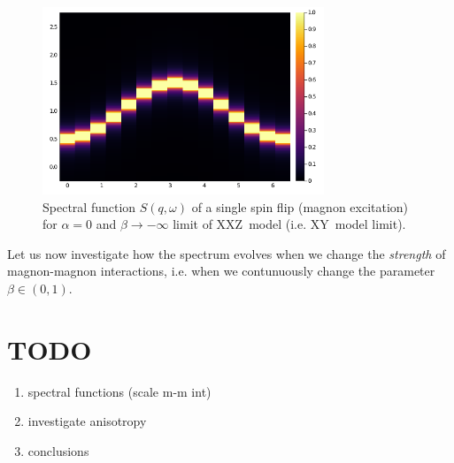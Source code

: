 \documentclass[12pt, a4paper]{article}
\begin{document}
\begin{figure}[h!]
	\centering
	\includegraphics[width=0.75\textwidth]{../figures/fig003.png}
	\caption{Spectral function $S(q,\omega)$ of a single spin flip (magnon excitation) for $\alpha = 0$ and $\beta \to -\infty$ limit of XXZ~model (i.e. XY~model limit).}\label{fig:XY_limit}
\end{figure}

Let us now investigate how the spectrum evolves when we change the \textit{strength} of magnon-magnon interactions, i.e. when we contunuously change the parameter $\beta \in (0,1)$. 

\section{TODO}
\begin{enumerate}
	\item spectral functions (scale m-m int)
	\item investigate anisotropy
	\item conclusions
\end{enumerate}



\end{document}
